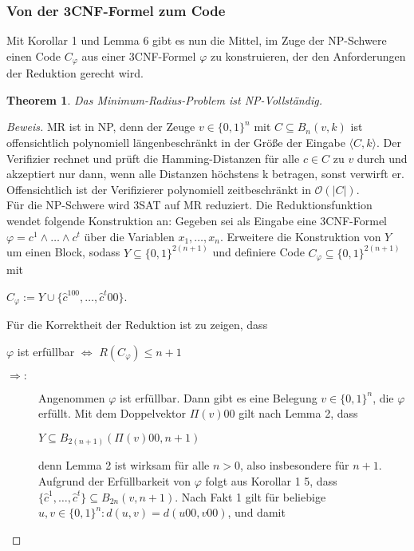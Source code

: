 \documentclass[11pt]{article}
\newtheorem{theorem}{Theorem}
\theoremstyle{break}
\theoremstyle{norm}
\begin{document}
\subsubsection{Von der 3CNF-Formel zum Code}\label{red}
Mit Korollar 1 und Lemma 6 gibt es nun die Mittel, im Zuge der NP-Schwere einen Code $C_\varphi$ aus einer 3CNF-Formel $\varphi$ zu konstruieren, der den Anforderungen der Reduktion gerecht wird.
\begin{theorem}
Das Minimum-Radius-Problem ist NP-Vollständig.
\end{theorem}
\begin{proof}[Beweis]
MR ist in NP, denn der Zeuge $v\in\{0,1\}^n$ mit $C \subseteq B_n(v,k)$ ist offensichtlich polynomiell längenbeschränkt in der Größe der Eingabe $\langle C,k \rangle$.
Der Verifizier rechnet und prüft die Hamming-Distanzen für alle $c \in C$ zu $v$ durch und akzeptiert nur dann, wenn alle Distanzen höchstens k betragen, sonst verwirft er.
Offensichtlich ist der Verifizierer polynomiell zeitbeschränkt in $\mathcal{O}(|C|)$.\\
Für die NP-Schwere wird 3SAT auf MR reduziert. Die Reduktionsfunktion wendet folgende Konstruktion an:
Gegeben sei als Eingabe eine 3CNF-Formel $\varphi=c^1 \land \ldots \land c^t$ über die Variablen $x_1,\ldots,x_n$. Erweitere die Konstruktion von $Y$ um einen Block, sodass $Y\subseteq\{0,1\}^{2(n+1)}$ und definiere Code $C_\varphi \subseteq \{0,1\}^{2(n+1)}$ mit 
\begin{center}
    $C_\varphi := Y \cup \{\hat{c}^100,\ldots,\hat{c}^t00\}$.
\end{center}
Für die Korrektheit der Reduktion ist zu zeigen, dass
\begin{center}
    $\varphi$ ist erfüllbar $\Leftrightarrow$ $R(C_\varphi) \leq n+1$
\end{center}
\begin{description}
    \item[$\Rightarrow:$]  Angenommen $\varphi$ ist erfüllbar.
Dann gibt es eine Belegung $v\in\{0,1\}^n$, die $\varphi$ erfüllt. Mit dem Doppelvektor $\Pi(v)00$ gilt nach Lemma 2, dass 
\begin{center}
    $Y\subseteq B_{2(n+1)}(\Pi(v)00,n+1)$ 
\end{center}
denn Lemma 2 ist wirksam für alle $n>0$, also insbesondere für $n+1$.\\
Aufgrund der Erfüllbarkeit von $\varphi$ folgt aus Korollar 1 5, dass $\{\hat{c}^1,\ldots,\hat{c}^t\}\subseteq B_{2n}(v,n+1)$. Nach Fakt 1 gilt für beliebige $u,v\in \{0,1\}^n:  d(u,v)=d(u00,v00)$, und damit

\end{description}
\end{proof}
\end{document}
